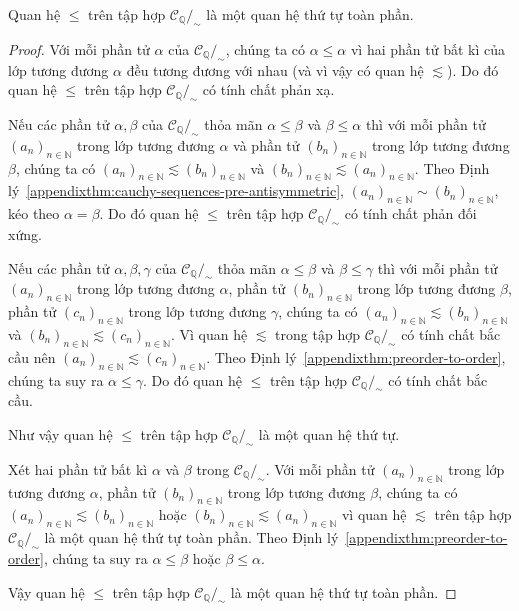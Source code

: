 \begin{appendixthm}
    Quan hệ $\leq$ trên tập hợp $\mathscr{C}_{\mathbb{Q}}/_{\sim}$ là một quan hệ thứ tự toàn phần.
\end{appendixthm}

\begin{proof}
    Với mỗi phần tử $\alpha$ của $\mathscr{C}_{\mathbb{Q}}/_{\sim}$, chúng ta có $\alpha\leq\alpha$ vì hai phần tử bất kì của lớp tương đương $\alpha$ đều tương đương với nhau (và vì vậy có quan hệ $\lesssim$). Do đó quan hệ $\leq$ trên tập hợp $\mathscr{C}_{\mathbb{Q}}/_{\sim}$ có tính chất phản xạ.

    Nếu các phần tử $\alpha, \beta$ của $\mathscr{C}_{\mathbb{Q}}/_{\sim}$ thỏa mãn $\alpha\leq \beta$ và $\beta\leq \alpha$ thì với mỗi phần tử ${(a_{n})}_{n\in\mathbb{N}}$ trong lớp tương đương $\alpha$ và phần tử ${(b_{n})}_{n\in\mathbb{N}}$ trong lớp tương đương $\beta$, chúng ta có ${(a_{n})}_{n\in\mathbb{N}}\lesssim {(b_{n})}_{n\in\mathbb{N}}$ và ${(b_{n})}_{n\in\mathbb{N}}\lesssim {(a_{n})}_{n\in\mathbb{N}}$. Theo Định lý~\ref{appendixthm:cauchy-sequences-pre-antisymmetric}, ${(a_{n})}_{n\in\mathbb{N}}\sim {(b_{n})}_{n\in\mathbb{N}}$, kéo theo $\alpha = \beta$. Do đó quan hệ $\leq$ trên tập hợp $\mathscr{C}_{\mathbb{Q}}/_{\sim}$ có tính chất phản đối xứng.

    Nếu các phần tử $\alpha, \beta, \gamma$ của $\mathscr{C}_{\mathbb{Q}}/_{\sim}$ thỏa mãn $\alpha\leq \beta$ và $\beta\leq \gamma$ thì với mỗi phần tử ${(a_{n})}_{n\in\mathbb{N}}$ trong lớp tương đương $\alpha$, phần tử ${(b_{n})}_{n\in\mathbb{N}}$ trong lớp tương đương $\beta$, phần tử ${(c_{n})}_{n\in\mathbb{N}}$ trong lớp tương đương $\gamma$, chúng ta có ${(a_{n})}_{n\in\mathbb{N}}\lesssim {(b_{n})}_{n\in\mathbb{N}}$ và ${(b_{n})}_{n\in\mathbb{N}}\lesssim {(c_{n})}_{n\in\mathbb{N}}$. Vì quan hệ $\lesssim$ trong tập hợp $\mathscr{C}_{\mathbb{Q}}/_{\sim}$ có tính chất bắc cầu nên ${(a_{n})}_{n\in\mathbb{N}}\lesssim {(c_{n})}_{n\in\mathbb{N}}$. Theo Định lý~\ref{appendixthm:preorder-to-order}, chúng ta suy ra $\alpha\leq \gamma$. Do đó quan hệ $\leq$ trên tập hợp $\mathscr{C}_{\mathbb{Q}}/_{\sim}$ có tính chất bắc cầu.

    Như vậy quan hệ $\leq$ trên tập hợp $\mathscr{C}_{\mathbb{Q}}/_{\sim}$ là một quan hệ thứ tự.

    Xét hai phần tử bất kì $\alpha$ và $\beta$ trong $\mathscr{C}_{\mathbb{Q}}/_{\sim}$. Với mỗi phần tử ${(a_{n})}_{n\in\mathbb{N}}$ trong lớp tương đương $\alpha$, phần tử ${(b_{n})}_{n\in\mathbb{N}}$ trong lớp tương đương $\beta$, chúng ta có ${(a_{n})}_{n\in\mathbb{N}}\lesssim {(b_{n})}_{n\in\mathbb{N}}$ hoặc ${(b_{n})}_{n\in\mathbb{N}}\lesssim {(a_{n})}_{n\in\mathbb{N}}$ vì quan hệ $\lesssim$ trên tập hợp $\mathscr{C}_{\mathbb{Q}}/_{\sim}$ là một quan hệ thứ tự toàn phần. Theo Định lý~\ref{appendixthm:preorder-to-order}, chúng ta suy ra $\alpha\leq \beta$ hoặc $\beta\leq \alpha$.

    Vậy quan hệ $\leq$ trên tập hợp $\mathscr{C}_{\mathbb{Q}}/_{\sim}$ là một quan hệ thứ tự toàn phần.
\end{proof}

